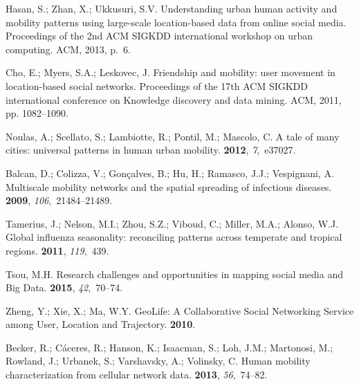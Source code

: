 \documentclass[ijgi,article,accept,moreauthors,pdftex,10pt,a4paper]{mdpi}
\theoremstyle{mdpi}
\newcounter{re}
\theoremstyle{mdpidefinition}
\begin{document}
\begin{thebibliography}{-------}
Hasan, S.; Zhan, X.; Ukkusuri, S.V.
\newblock Understanding urban human activity and mobility patterns using
  large-scale location-based data from online social media.
\newblock  Proceedings of the 2nd ACM SIGKDD international workshop on urban
  computing. ACM,  2013, p.~6.

Cho, E.; Myers, S.A.; Leskovec, J.
\newblock Friendship and mobility: user movement in location-based social
  networks.
\newblock  Proceedings of the 17th ACM SIGKDD international conference on
  Knowledge discovery and data mining. ACM,  2011, pp. 1082--1090.

Noulas, A.; Scellato, S.; Lambiotte, R.; Pontil, M.; Mascolo, C.
\newblock A tale of many cities: universal patterns in human urban mobility.
 {\bf 2012}, {\em 7},~e37027.

Balcan, D.; Colizza, V.; Gon{\c{c}}alves, B.; Hu, H.; Ramasco, J.J.;
  Vespignani, A.
\newblock Multiscale mobility networks and the spatial spreading of infectious
  diseases.
 {\bf 2009},
  {\em 106},~21484--21489.

Tamerius, J.; Nelson, M.I.; Zhou, S.Z.; Viboud, C.; Miller, M.A.; Alonso, W.J.
\newblock Global influenza seasonality: reconciling patterns across temperate
  and tropical regions.
 {\bf 2011}, {\em 119},~439.

Tsou, M.H.
\newblock Research challenges and opportunities in mapping social media and Big
  Data.
 {\bf 2015}, {\em
  42},~70--74.

Zheng, Y.; Xie, X.; Ma, W.Y.
\newblock GeoLife: A Collaborative Social Networking Service among User,
  Location and Trajectory. {\bf 2010}.

Becker, R.; C{\'a}ceres, R.; Hanson, K.; Isaacman, S.; Loh, J.M.; Martonosi,
  M.; Rowland, J.; Urbanek, S.; Varshavsky, A.; Volinsky, C.
\newblock Human mobility characterization from cellular network data.
 {\bf 2013}, {\em 56},~74--82.


\end{thebibliography}
\end{document}
